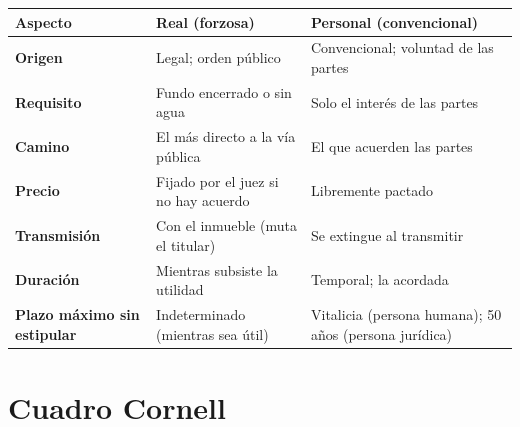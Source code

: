 \documentclass[12pt,oneside]{book}
\begin{document}
\begin{table}[H]
\centering
\small
\begin{tabularx}{\textwidth}{>{\raggedright\arraybackslash}p{} >{\raggedright\arraybackslash}X >{\raggedright\arraybackslash}X}
\toprule
\textbf{Aspecto} & \textbf{Real (forzosa)} & \textbf{Personal (convencional)} \\
\midrule
\textbf{Origen} & Legal; orden público & Convencional; voluntad de las partes \\
\textbf{Requisito} & Fundo encerrado o sin agua & Solo el interés de las partes \\
\textbf{Camino} & El más directo a la vía pública & El que acuerden las partes \\
\textbf{Precio} & Fijado por el juez si no hay acuerdo & Libremente pactado \\
\textbf{Transmisión} & Con el inmueble (muta el titular) & Se extingue al transmitir \\
\textbf{Duración} & Mientras subsiste la utilidad & Temporal; la acordada \\
\textbf{Plazo máximo sin estipular} & Indeterminado (mientras sea útil) & Vitalicia (persona humana); 50 años (persona jurídica) \\
\bottomrule
\end{tabularx}
\end{table}

\section{Cuadro Cornell}
\end{document}
